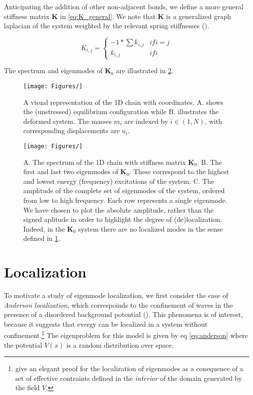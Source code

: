 \documentclass{article}
\begin{document}
Anticipating the addition of other non-adjacent bonds, we define a more general stiffness matrix $\bm{K}$ in \ref{eq:K_general}. 
We note that $\bm{K}$ is a generalized graph laplacian of the system weighted by the relevant spring stiffnesses (\cite{Chung1997-dc}).

\begin{equation}\label{eq:K_general}
	K_{i,j}= \begin{cases}
		-1 * \sum k_{i,j} & if i=j \\
		k_{i,j} & if i
	\end{cases}
\end{equation}

The spectrum and eigenmodes of $\bm{K}_0$ are illustrated in \ref{fig:lattice_spectrum}.

\begin{figure}
\begin{center}
	\texttt{[image: Figures/]}
\end{center}
\caption{A visual representation of the 1D chain with coordinates. 
	A. shows the (unstressed) equilibrium configuration while B. illustrates the deformed system.
The masses $m_i$ are indexed by $i \in (1, N)$, with corresponding displacements are $u_i$.}
\label{fig:1D_chain}
\end{figure}


\begin{figure}
\begin{center}
\texttt{[image: Figures/]}
\end{center}
\caption{A. The spectrum of the 1D chain with stiffness matrix $\bm{K}_0$. B. 
The first and last two eigenmodes of $\bm{K}_0$. These correspond to the highest and lowest energy (frequency) excitations of the system.
C. The amplitude of the complete set of eigenmodes of the system, ordered from low to high frequency. 
Each row represents a single eigenmode.
We have chosen to plot the absolute amplitude, rather than the signed aplitude in order to highlight the degree of (de)localization. 
Indeed, in the $\bm{K}_0$ system there are no localized modes in the sense defined in \ref{sec:localization}.}
\label{fig:lattice_spectrum}
\end{figure}

\section{Localization}
\label{sec:localization}

To motivate a study of eigenmode localization, we first consider the case of \textit{Anderson localization}, 
which correspoinds to the confinement of waves in the presence of a disordered background potential (\cite{Anderson1958-dt}).
This phenomena is of interest, because it suggests that evergy can be localized in a system without confinement.\footnote{
\cite{Filoche2012-av} give an elegant proof for the localization of eigenmodes as a conequence of a set of effective contraints defined in the \textit{interior} of the domain generated by the field $V$.}
The eigenproblem for this model is given by eq \ref{eq:anderson} where the potential $V(x)$ is a random distribution over space. 
\end{document}

